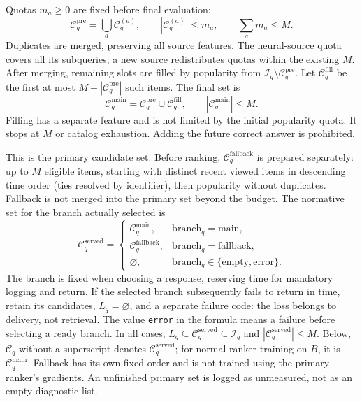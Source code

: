 \documentclass[12pt,a4paper]{article}
\newcommand{\code}[1]{{\ttfamily\small\nolinkurl{#1}}}
\theoremstyle{plainru}
\begin{document}
Quotas $m_a\ge0$ are fixed before final evaluation:
\begin{equation}\label{eq:model-candidate-union}
\mathcal C_q^{\mathrm{pre}}=\bigcup_a\mathcal C_q^{(a)},\qquad
|\mathcal C_q^{(a)}|\le m_a,\qquad
\sum_a m_a\le M.
\end{equation}
Duplicates are merged, preserving all source features.
The neural-source quota covers all its subqueries;
a new source redistributes quotas within the existing $M$.
After merging, remaining slots are filled by popularity
from $\mathcal I_q\setminus\mathcal C_q^{\mathrm{pre}}$.
Let $\mathcal C_q^{\mathrm{fill}}$ be the first at most
$M-|\mathcal C_q^{\mathrm{pre}}|$ such items. The final set is
\begin{equation}\label{eq:model-candidate-fill}
\mathcal C_q^{\mathrm{main}}=\mathcal C_q^{\mathrm{pre}}\cup\mathcal C_q^{\mathrm{fill}},
\qquad |\mathcal C_q^{\mathrm{main}}|\le M.
\end{equation}
Filling has a separate feature and is not limited by the initial
popularity quota. It stops at $M$ or catalog exhaustion.
Adding the future correct answer is prohibited.

This is the primary candidate set. Before ranking,
$\mathcal C_q^{\mathrm{fallback}}$ is prepared separately: up to $M$ eligible items, starting
with distinct recent viewed items in descending time order
(ties resolved by identifier), then popularity without duplicates.
Fallback is not merged into the primary set beyond the budget.
The normative set for the branch actually selected is
\begin{equation}\label{eq:model-served-candidates}
\mathcal C_q^{\mathrm{served}}=
\begin{cases}
\mathcal C_q^{\mathrm{main}},&\mathrm{branch}_q=\mathrm{main},\\
\mathcal C_q^{\mathrm{fallback}},&\mathrm{branch}_q=\mathrm{fallback},\\
\varnothing,&\mathrm{branch}_q\in\{\mathrm{empty},\mathrm{error}\}.
\end{cases}
\end{equation}
The branch is fixed when choosing a response, reserving time for mandatory
logging and return. If the selected branch subsequently fails to return in time,
retain its candidates, $L_q=\varnothing$, and a separate failure code:
the loss belongs to delivery, not retrieval. The value \code{error} in the formula
means a failure before selecting a ready branch. In all cases,
$L_q\subseteq\mathcal C_q^{\mathrm{served}}\subseteq\mathcal I_q$
and $|\mathcal C_q^{\mathrm{served}}|\le M$.
Below, $\mathcal C_q$ without a superscript denotes
$\mathcal C_q^{\mathrm{served}}$; for normal ranker training on $B$,
it is $\mathcal C_q^{\mathrm{main}}$. Fallback has its own fixed order
and is not trained using the primary ranker's gradients. An unfinished primary
set is logged as unmeasured, not as an empty diagnostic list.
\end{document}
